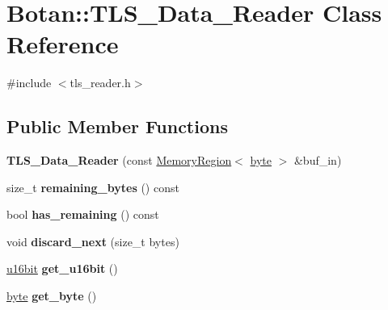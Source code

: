 \hypertarget{classBotan_1_1TLS__Data__Reader}{\section{Botan\-:\-:T\-L\-S\-\_\-\-Data\-\_\-\-Reader Class Reference}
\label{classBotan_1_1TLS__Data__Reader}
}


{\ttfamily \#include $<$tls\-\_\-reader.\-h$>$}

\subsection*{Public Member Functions}
\begin{DoxyCompactItemize}
\item 
\hypertarget{classBotan_1_1TLS__Data__Reader_aaa142cd179485a41d12d8dcb9ac8ad83}{{\bfseries T\-L\-S\-\_\-\-Data\-\_\-\-Reader} (const \hyperlink{classBotan_1_1MemoryRegion}{Memory\-Region}$<$ \hyperlink{namespaceBotan_a7d793989d801281df48c6b19616b8b84}{byte} $>$ \&buf\-\_\-in)}\label{classBotan_1_1TLS__Data__Reader_aaa142cd179485a41d12d8dcb9ac8ad83}

\item 
\hypertarget{classBotan_1_1TLS__Data__Reader_ab2c509fa60cd2f779c86b40a13b1dec6}{size\-\_\-t {\bfseries remaining\-\_\-bytes} () const }\label{classBotan_1_1TLS__Data__Reader_ab2c509fa60cd2f779c86b40a13b1dec6}

\item 
\hypertarget{classBotan_1_1TLS__Data__Reader_af6d95ce398981dacf44d05d1aec5d8ff}{bool {\bfseries has\-\_\-remaining} () const }\label{classBotan_1_1TLS__Data__Reader_af6d95ce398981dacf44d05d1aec5d8ff}

\item 
\hypertarget{classBotan_1_1TLS__Data__Reader_aea3d1cb0b8719fc6f667305cf43e0f46}{void {\bfseries discard\-\_\-next} (size\-\_\-t bytes)}\label{classBotan_1_1TLS__Data__Reader_aea3d1cb0b8719fc6f667305cf43e0f46}

\item 
\hypertarget{classBotan_1_1TLS__Data__Reader_a4e3a7529ecc001e62053f33349a22b03}{\hyperlink{namespaceBotan_ab07face63a00c39ea6ed97f203ee501c}{u16bit} {\bfseries get\-\_\-u16bit} ()}\label{classBotan_1_1TLS__Data__Reader_a4e3a7529ecc001e62053f33349a22b03}

\item 
\hypertarget{classBotan_1_1TLS__Data__Reader_a5a1da5668fa1dfdd3ae704599275cd60}{\hyperlink{namespaceBotan_a7d793989d801281df48c6b19616b8b84}{byte} {\bfseries get\-\_\-byte} ()}\label{classBotan_1_1TLS__Data__Reader_a5a1da5668fa1dfdd3ae704599275cd60}


\end{DoxyCompactItemize}
